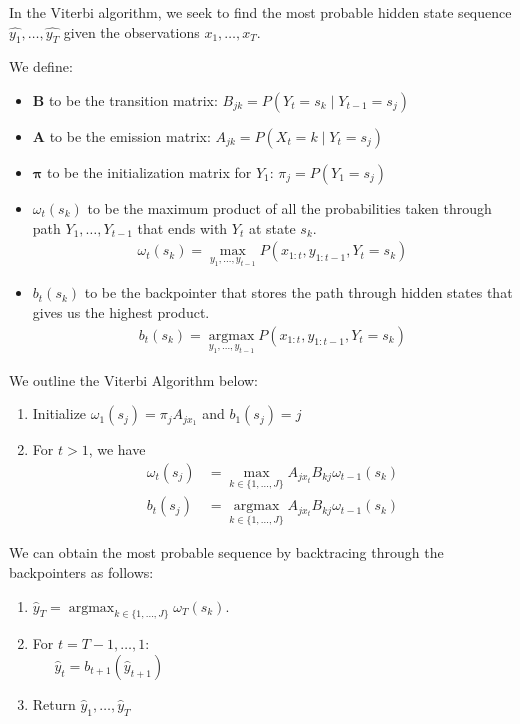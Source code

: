 \documentclass[11pt,addpoints,answers]{exam}
\newcommand \argmax {\operatorname*{argmax}}
\begin{document}
\begin{questions}
In the Viterbi algorithm, we seek to find the most probable hidden state sequence $\hat{y_1}, \dots, \hat{y_T}$ given the observations $x_1,\dots,x_T$. 

We define:
\begin{itemize}
    \item $\mathbf{B}$ to be the transition matrix: $B_{jk} = P(Y_{t} = s_{k} \mid Y_{t-1} = s_{j})$
    \item $\mathbf{A}$ to be the emission matrix: $A_{jk} = P(X_{t} = k \mid Y_{t} = s_{j})$
    \item $\boldsymbol{\pi}$ to be the initialization matrix for $Y_1$: $\pi_j = P(Y_1 = s_j)$
    \item $\omega_t(s_k)$ to be the maximum product of all the probabilities taken through path $Y_1, \dots, Y_{t-1}$ that ends with $Y_t$ at state $s_k$.
    \begin{align}
    \omega_t(s_k) = \max_{y_1,\dots, y_{t-1}} P(x_{1:t},y_{1:t-1},Y_t=s_k)    
    \end{align}
    \item $b_t(s_k)$ to be the backpointer that stores the path through hidden states that gives us the highest product.
    \begin{align}
    b_t(s_k) = \argmax_{y_1,\dots, y_{t-1}} P(x_{1:t},y_{1:t-1},Y_t=s_k)    
    \end{align}
\end{itemize}

We outline the Viterbi Algorithm below:
\begin{enumerate}
    \item Initialize $\omega_1(s_j) = \pi_{j} A_{jx_{1}}$ and $b_1(s_j) = j$
    \item For $t > 1$, we have 
    \begin{align*}
        \omega_t(s_j) &= \max_{k \in \{1,\dots,J\}} A_{j x_{t}} B_{kj} \omega_{t-1}(s_k) \\
        b_t(s_j) &= \argmax_{k \in \{1,\dots,J\}} A_{j x_{t}} B_{kj} \omega_{t-1}(s_k)
    \end{align*}
\end{enumerate}

We can obtain the most probable sequence by backtracing through the backpointers as follows:
\begin{enumerate}
    \item $\hat{y}_T = \argmax_{k \in \{1,\dots,J\}} \omega_T(s_k)$. 
    \item For $t = T-1,\dots,1$: \\
    $~~~~~~~\hat{y}_{t} = b_{t+1}(\hat{y}_{t+1})$
    \item Return $\hat{y}_1, \dots, \hat{y}_T$
\end{enumerate}


\end{questions}
\end{document}
